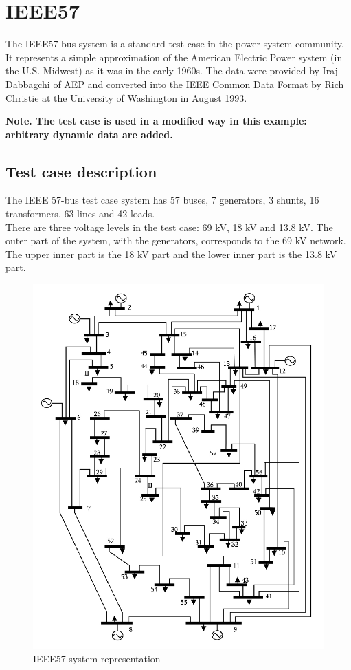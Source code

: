 \documentclass[a4paper, 12pt]{report}
\begin{document}
\chapter{IEEE57}

The IEEE57 bus system is a standard test case in the power system community. It represents a simple approximation of the American Electric Power system (in the U.S. Midwest) as it was in the early 1960s. The data were provided by Iraj Dabbagchi of AEP and converted into the IEEE Common Data Format by Rich Christie at the University of Washington in August 1993.

\textbf{Note. The test case is used in a modified way in this example: arbitrary dynamic data are added.}

\section{Test case description}

The IEEE 57-bus test case system has 57 buses, 7 generators, 3 shunts, 16 transformers, 63 lines and 42 loads.\\
There are three voltage levels in the test case: 69 kV, 18 kV and 13.8 kV. The outer part of the system, with the generators, corresponds to the 69 kV network. The upper inner part is the 18 kV part and the lower inner part is the 13.8 kV part.

\begin{figure}[H]
\includegraphics[scale=0.5]{IEEE57BusSystem.png}
\caption{IEEE57 system representation}
\label{circuit-1}
\end{figure}
\end{document}
